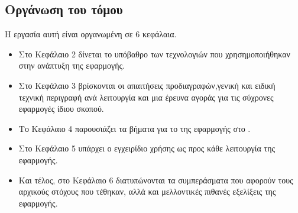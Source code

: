 \subsection*{Οργάνωση του τόμου}
\pSpace Η εργασία αυτή είναι οργανωμένη σε 6 κεφάλαια.
\begin{itemize}
    \item Στο Κεφάλαιο 2 δίνεται το υπόβαθρο των τεχνολογιών που χρησημοποιήθηκαν στην ανάπτυξη της εφαρμογής.
    \item Στο Κεφάλαιο 3 βρίσκονται οι απαιτήσεις προδιαγραφών,γενική και ειδική τεχνική περιγραφή ανά λειτουργία και μια έρευνα αγοράς για τις σύχρονες εφαρμογές ίδιου σκοπού.
    \item Το Κεφάλαιο 4 παρουσιάζει τα βήματα για το  της εφαρμογής στο .
    \item Στο Κεφάλαιο 5 υπάρχει ο εγχειρίδιο χρήσης ως προς κάθε λειτουργία της εφαρμογής.
    \item Και τέλος, στο Κεφάλαιο 6 διατυπώνονται τα συμπεράσματα που αφορούν τους αρχικούς στόχους που τέθηκαν, αλλά και μελλοντικές πιθανές εξελίξεις της εφαρμογής.
\end{itemize}